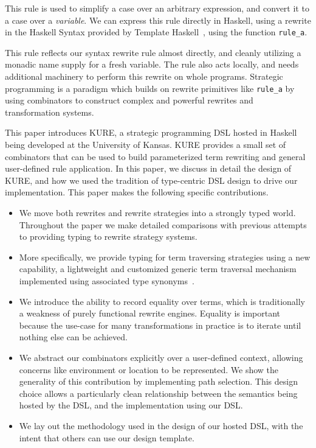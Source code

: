 \documentclass{article}
\begin{document}
This rule is used to simplify a case over an arbitrary expression, and convert it to a case over a {\em variable\/}.
We can express this rule directly in Haskell, using a rewrite in the Haskell Syntax provided by Template Haskell~\cite{metahaskell}, using the function \verb|rule_a|.

This rule reflects our syntax rewrite rule almost directly,
and cleanly utilizing a monadic name supply for a fresh variable.
The rule also acts locally, and needs additional machinery to perform this rewrite on whole programs. 
Strategic programming is a paradigm which builds on rewrite primitives like \verb|rule_a|
by using combinators to construct complex and powerful rewrites and transformation systems. 

This paper introduces KURE, a strategic programming DSL hosted in Haskell being developed
at the University of Kansas. KURE provides a small set of combinators that can be used
to build parameterized term rewriting and general user-defined rule application. In this paper, we discuss
in detail the design of KURE, and how we used the tradition of type-centric DSL design
to drive our implementation. This paper makes the following specific contributions.
\begin{itemize}        

\item We move both rewrites and rewrite strategies into a strongly typed world.
Throughout the paper we make detailed comparisons with previous attempts to providing typing to 
rewrite strategy systems.

\item More specifically, we provide typing for term traversing strategies
using a new capability, a light\-weight and
customized generic term traversal mechanism implemented using associated type synonyms~\cite{Chakavarty:AssocTypeSyn}.

\item We introduce the ability to record equality over terms, which is traditionally a weakness of purely functional rewrite engines.
Equality is important because the use-case for many transformations in practice is to iterate until nothing else can be achieved.

\item We abstract our combinators explicitly over a user-defined context, allowing concerns like environment or location to be 
represented.
We show the generality of this contribution by implementing path selection.
This design choice allows a particularly clean relationship between the semantics being hosted by the DSL, and the implementation using our DSL.


\item We lay out the methodology used in the design of our hosted DSL, with the intent that others can
use our design template.


\end{itemize}
\end{document}
